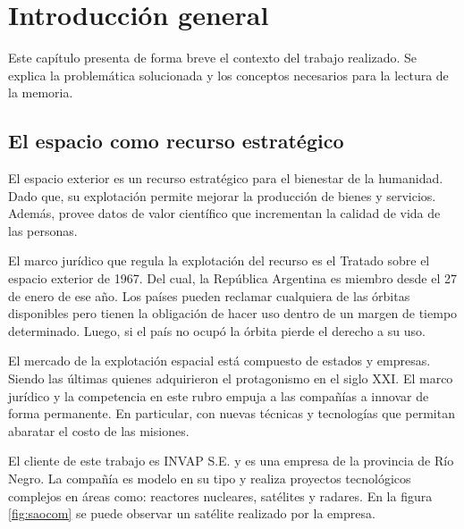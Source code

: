 \chapter{Introducción general}
\label{ch:introduccion}

Este capítulo presenta de forma breve el contexto del trabajo realizado.
Se explica la problemática solucionada y los conceptos necesarios para la lectura de la memoria.

\newcommand{\keyword}[1]{\textbf{#1}}
\newcommand{\tabhead}[1]{\textbf{#1}}
\newcommand{\code}[1]{\texttt{#1}}
\newcommand{\file}[1]{\texttt{\bfseries#1}}
\newcommand{\option}[1]{\texttt{\itshape#1}}
\newcommand{\grados}{$^{\circ}$}

\section{El espacio como recurso estratégico}
\label{sec:1space}

El espacio exterior es un recurso estratégico para el bienestar de la humanidad.
Dado que, su explotación permite mejorar la producción de bienes y servicios.
Además, provee datos de valor científico que incrementan la calidad de vida de las personas.

El marco jurídico que regula la explotación del recurso es el Tratado sobre el espacio exterior de 1967.
Del cual, la República Argentina es miembro desde el 27 de enero de ese año.
Los países pueden reclamar cualquiera de las órbitas disponibles pero tienen la obligación de hacer uso dentro de un margen de tiempo determinado.
Luego, si el país no ocupó la órbita pierde el derecho a su uso.

El mercado de la explotación espacial está compuesto de estados y empresas.
Siendo las últimas quienes adquirieron el protagonismo en el siglo XXI.
El marco jurídico y la competencia en este rubro empuja a las compañías a innovar de forma permanente.
En particular, con nuevas técnicas y tecnologías que permitan abaratar el costo de las misiones.

El cliente de este trabajo es INVAP S.E. y es una empresa de la provincia de Río Negro.
La compañía es modelo en su tipo y realiza proyectos tecnológicos complejos en áreas como: reactores nucleares, satélites y radares.
En la figura \ref{fig:saocom} se puede observar un satélite realizado por la empresa.


